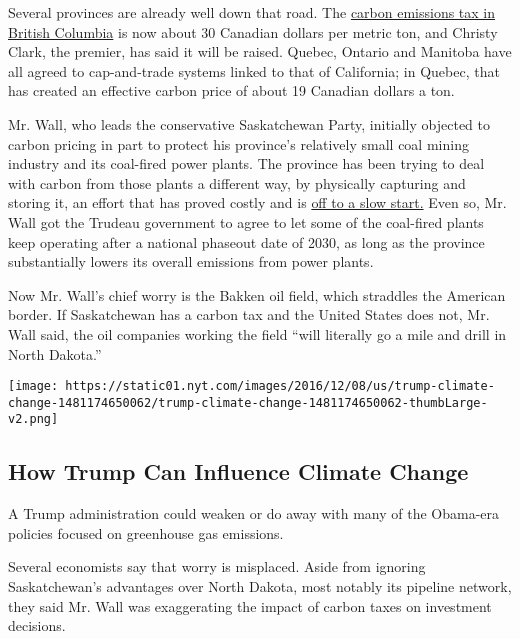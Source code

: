 Several provinces are already well down that road. The
\href{http://www.nytimes.com/2016/03/02/business/does-a-carbon-tax-work-ask-british-columbia.html}{carbon
emissions tax in British Columbia} is now about 30 Canadian dollars per
metric ton, and Christy Clark, the premier, has said it will be raised.
Quebec, Ontario and Manitoba have all agreed to cap-and-trade systems
linked to that of California; in Quebec, that has created an effective
carbon price of about 19 Canadian dollars a ton.

Mr. Wall, who leads the conservative Saskatchewan Party, initially
objected to carbon pricing in part to protect his province's relatively
small coal mining industry and its coal-fired power plants. The province
has been trying to deal with carbon from those plants a different way,
by physically capturing and storing it, an effort that has proved costly
and is
\href{http://www.nytimes.com/2016/03/30/business/energy-environment/technology-to-make-clean-energy-from-coal-is-stumbling-in-practice.html}{off
to a slow start.} Even so, Mr. Wall got the Trudeau government to agree
to let some of the coal-fired plants keep operating after a national
phaseout date of 2030, as long as the province substantially lowers its
overall emissions from power plants.

Now Mr. Wall's chief worry is the Bakken oil field, which straddles the
American border. If Saskatchewan has a carbon tax and the United States
does not, Mr. Wall said, the oil companies working the field ``will
literally go a mile and drill in North Dakota.''

\href{https://www.nytimes.com/interactive/2016/12/08/us/trump-climate-change.html}{}

\texttt{[image: https://static01.nyt.com/images/2016/12/08/us/trump-climate-change-1481174650062/trump-climate-change-1481174650062-thumbLarge-v2.png]}

\hypertarget{how-trump-can-influence-climate-change}{%
\subsection{How Trump Can Influence Climate
Change}\label{how-trump-can-influence-climate-change}}

A Trump administration could weaken or do away with many of the
Obama-era policies focused on greenhouse gas emissions.

Several economists say that worry is misplaced. Aside from ignoring
Saskatchewan's advantages over North Dakota, most notably its pipeline
network, they said Mr. Wall was exaggerating the impact of carbon taxes
on investment decisions.

